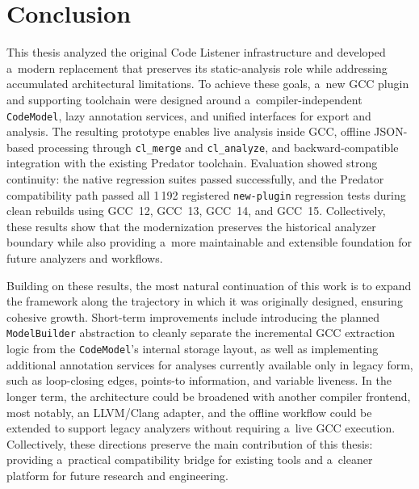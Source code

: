 \documentclass[xpsejal00-gcc-plugin.tex]{subfiles}
\begin{document}
\chapter{Conclusion}\label{chap:conclusion}

This thesis analyzed the original Code Listener infrastructure and developed a~modern replacement that preserves its static-analysis role while addressing accumulated architectural limitations.
To achieve these goals, a~new GCC plugin and supporting toolchain were designed around a~compiler-independent \texttt{CodeModel}, lazy annotation services, and unified interfaces for export and analysis.
The resulting prototype enables live analysis inside GCC, offline JSON-based processing through \texttt{cl\_merge} and \texttt{cl\_analyze}, and backward-compatible integration with the existing Predator toolchain.
Evaluation showed strong continuity: the native regression suites passed successfully, and the Predator compatibility path passed all 1\,192 registered \texttt{new-plugin} regression tests during clean rebuilds using GCC~12, GCC~13, GCC~14, and GCC~15.
Collectively, these results show that the modernization preserves the historical analyzer boundary while also providing a~more maintainable and extensible foundation for future analyzers and workflows.

Building on these results, the most natural continuation of this work is to expand the framework along the trajectory in which it was originally designed, ensuring cohesive growth.
Short-term improvements include introducing the planned \texttt{ModelBuilder} abstraction to cleanly separate the incremental GCC extraction logic from the \texttt{CodeModel}'s internal storage layout, as well as implementing additional annotation services for analyses currently available only in legacy form, such as loop-closing edges, points-to information, and variable liveness.
In the longer term, the architecture could be broadened with another compiler frontend, most notably, an LLVM/Clang adapter, and the offline workflow could be extended to support legacy analyzers without requiring a~live GCC execution.
Collectively, these directions preserve the main contribution of this thesis: providing a~practical compatibility bridge for existing tools and a~cleaner platform for future research and engineering.
\end{document}

